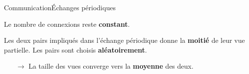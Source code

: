 \begin{frame}{Communication}{Échanges périodiques}
 
  Le nombre de connexions reste \textbf{constant}.
 
  \vspace{0.5cm}

  Les deux pairs impliqués dans l'échange périodique donne la \textbf{moitié} de
  leur vue partielle. Les pairs sont choisis \textbf{aléatoirement}.
  \begin{itemize}
  \item [$\rightarrow$] La taille des vues converge vers la \textbf{moyenne} des
    deux.
  \end{itemize}
  

  \vspace{0.5cm}\hspace{-1cm}
  \begin{minipage}{0.32\textwidth}
    \begin{center}
      
    \end{center}
  \end{minipage}
  \hspace{0.35cm}
  \begin{minipage}{0.32\textwidth}
    \begin{center}
      
    \end{center}
  \end{minipage}
  \hspace{0.35cm}
  \begin{minipage}{0.32\textwidth}
    \begin{center}
      
    \end{center}
  \end{minipage}






\end{frame}
